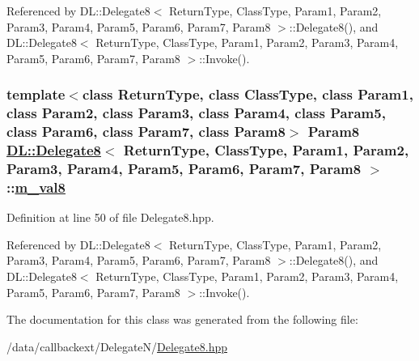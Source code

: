 Referenced by DL::Delegate8$<$ Return\-Type, Class\-Type, Param1, Param2, Param3, Param4, Param5, Param6, Param7, Param8 $>$::Delegate8(), and DL::Delegate8$<$ Return\-Type, Class\-Type, Param1, Param2, Param3, Param4, Param5, Param6, Param7, Param8 $>$::Invoke().\hypertarget{classDL_1_1Delegate8_r9}{
\subsubsection[m\_\-val8]{\setlength{\rightskip}{0pt plus 5cm}template$<$class Return\-Type, class Class\-Type, class Param1, class Param2, class Param3, class Param4, class Param5, class Param6, class Param7, class Param8$>$ Param8 \hyperlink{classDL_1_1Delegate8}{DL::Delegate8}$<$ Return\-Type, Class\-Type, Param1, Param2, Param3, Param4, Param5, Param6, Param7, Param8 $>$::\hyperlink{classDL_1_1Delegate8_r9}{m\_\-val8}}}
\label{classDL_1_1Delegate8_r9}




Definition at line 50 of file Delegate8.hpp.

Referenced by DL::Delegate8$<$ Return\-Type, Class\-Type, Param1, Param2, Param3, Param4, Param5, Param6, Param7, Param8 $>$::Delegate8(), and DL::Delegate8$<$ Return\-Type, Class\-Type, Param1, Param2, Param3, Param4, Param5, Param6, Param7, Param8 $>$::Invoke().

The documentation for this class was generated from the following file:\begin{CompactItemize}
\item 
/data/callbackext/Delegate\-N/\hyperlink{Delegate8_8hpp}{Delegate8.hpp}\end{CompactItemize}
